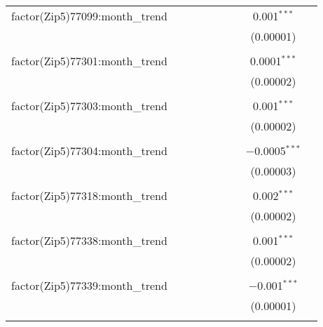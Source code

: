 \begin{table}[H]
{\begin{tabular}{@{\extracolsep{5pt}}lcccccccc}
  factor(Zip5)77099:month\_trend &  &  &  &  &  &  & 0.001$^{***}$ &  \\  

   &  &  &  &  &  &  & (0.00001) &  \\  

   & & & & & & & & \\  

  factor(Zip5)77301:month\_trend &  &  &  &  &  &  & 0.0001$^{***}$ &  \\  

   &  &  &  &  &  &  & (0.00002) &  \\  

   & & & & & & & & \\  

  factor(Zip5)77303:month\_trend &  &  &  &  &  &  & 0.001$^{***}$ &  \\  

   &  &  &  &  &  &  & (0.00002) &  \\  

   & & & & & & & & \\  

  factor(Zip5)77304:month\_trend &  &  &  &  &  &  & $-$0.0005$^{***}$ &  \\  

   &  &  &  &  &  &  & (0.00003) &  \\  

   & & & & & & & & \\  

  factor(Zip5)77318:month\_trend &  &  &  &  &  &  & 0.002$^{***}$ &  \\  

   &  &  &  &  &  &  & (0.00002) &  \\  

   & & & & & & & & \\  

  factor(Zip5)77338:month\_trend &  &  &  &  &  &  & 0.001$^{***}$ &  \\  

   &  &  &  &  &  &  & (0.00002) &  \\  

   & & & & & & & & \\  

  factor(Zip5)77339:month\_trend &  &  &  &  &  &  & $-$0.001$^{***}$ &  \\  

   &  &  &  &  &  &  & (0.00001) &  \\  

   & & & & & & & & \\  


\end{tabular}}
\end{table}

